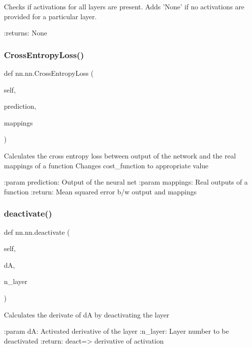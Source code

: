 \begin{DoxyVerb}Checks if activations for all layers are present. Adds 'None' if no activations are provided for a particular layer.

:returns: None
\end{DoxyVerb}
 \mbox{\label{classnn_1_1nn_a822299322a0b513f8985e61096be45bc}} 
\subsubsection{\texorpdfstring{Cross\+Entropy\+Loss()}{CrossEntropyLoss()}}
{\footnotesize\ttfamily def nn.\+nn.\+Cross\+Entropy\+Loss (\begin{DoxyParamCaption}\item[{}]{self,  }\item[{}]{prediction,  }\item[{}]{mappings }\end{DoxyParamCaption})}

\begin{DoxyVerb}Calculates the cross entropy loss between output of the network and the real mappings of a function
Changes cost_function to appropriate value

:param prediction: Output of the neural net
:param mappings: Real outputs of a function
:return: Mean squared error b/w output and mappings
\end{DoxyVerb}
 \mbox{\label{classnn_1_1nn_a475811849fd370a47eb0e3b7bc09b283}} 
\subsubsection{\texorpdfstring{deactivate()}{deactivate()}}
{\footnotesize\ttfamily def nn.\+nn.\+deactivate (\begin{DoxyParamCaption}\item[{}]{self,  }\item[{}]{dA,  }\item[{}]{n\+\_\+layer }\end{DoxyParamCaption})}

\begin{DoxyVerb}Calculates the derivate of dA by deactivating the layer

:param dA: Activated derivative of the layer
:n_layer: Layer number to be deactivated
:return: deact=> derivative of activation 
\end{DoxyVerb}
 \mbox{\label{classnn_1_1nn_ae07002745b03901814d92ac66fe87781}} 
